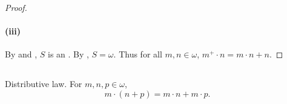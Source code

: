 \documentclass{report}
\begin{document}
\begin{proof}
  \paragraph{(iii)}%

    By  and
      , $S$ is an
      .
    By , $S = \omega$.
    Thus for all $m, n \in \omega$, $m^+ \cdot n = m \cdot n + n$.

\end{proof}

\subsection{}

\begin{theorem}[4K-3]

  Distributive law.
  For $m, n, p \in \omega$, $$m \cdot (n + p) = m \cdot n + m \cdot p.$$

\end{theorem}
\end{document}
